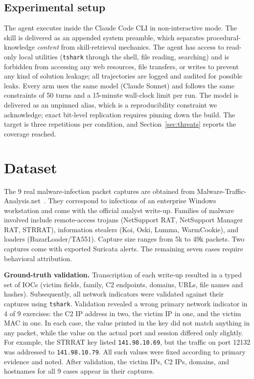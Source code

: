 \documentclass[conference]{IEEEtran}
\newcommand{\num}[1]{#1} %
\begin{document}
\subsection{Experimental setup}\label{sec:setup}
The agent executes inside the Claude Code CLI in non-interactive mode. The skill is
delivered as an appended system preamble, which separates procedural-knowledge
\emph{content} from skill-retrieval mechanics. The agent has access to read-only local
utilities (\texttt{tshark} through the shell, file reading, searching) and is forbidden from
accessing any web resources, file transfers, or writes to prevent any kind of solution
leakage; all trajectories are logged and audited for possible leaks. Every arm uses the same
model (Claude Sonnet) and follows the same constraints of \num{50} turns and a
\num{15}-minute wall-clock limit per run. The model is delivered as an unpinned alias, which
is a reproducibility constraint we acknowledge; exact bit-level replication requires pinning
down the build. The target is three repetitions per condition, and Section~\ref{sec:threats}
reports the coverage reached.

\section{Dataset}\label{sec:dataset}
The \num{9} real malware-infection packet captures are obtained from
Malware-Traffic-Analysis.net~\cite{mta}. They correspond to infections of an enterprise
Windows workstation and come with the official analyst write-up. Families of malware
involved include remote-access trojans (NetSupport RAT, NetSupport Manager RAT, STRRAT),
information stealers (Koi, Oski, Lumma, WarmCookie), and loaders (BazarLoader/TA551).
Capture size ranges from \num{5}k to \num{49}k packets. Two captures come with exported
Suricata alerts. The remaining seven cases require behavioral attribution.

\textbf{Ground-truth validation.} Transcription of each write-up resulted in a typed set of
IOCs (victim fields, family, C2 endpoints, domains, URLs, file names and hashes).
Subsequently, all network indicators were validated against their captures using
\texttt{tshark}. Validation revealed a wrong primary network indicator in \num{4} of \num{9}
exercises: the C2 IP address in two, the victim IP in one, and the victim MAC in one. In
each case, the value printed in the key did not match anything in any packet, while the
value on the actual port and session differed only slightly. For example, the STRRAT key
listed \texttt{141.98.10.69}, but the traffic on port 12132 was addressed to
\texttt{141.98.10.79}. All such values were fixed according to primary evidence and noted.
After validation, the victim IPs, C2 IPs, domains, and hostnames for all \num{9} cases
appear in their captures.
\end{document}
